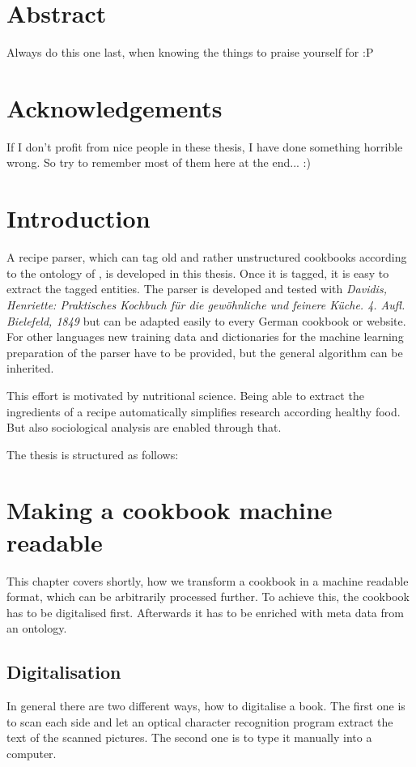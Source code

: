 \documentclass[12pt, twoside]{report}
\begin{document}
\chapter*{Abstract}
Always do this one last, when knowing the things to praise  yourself for :P

\chapter*{Acknowledgements}
If I don't profit from nice people in these thesis, I have done something horrible wrong. So try to remember most of them here at the end... :)

\tableofcontents

\listoffigures
\begingroup
	\let\clearpage\relax
	\listoftables
\endgroup

\clearpage
{}  
\chapter{Introduction}
A recipe parser, which can tag old and rather unstructured cookbooks according to the ontology of \parencite{schemaOrg}, is developed in this thesis. Once it is tagged, it is easy to extract the tagged entities. The parser is developed and tested with \textit{Davidis, Henriette: Praktisches Kochbuch für die gewöhnliche und feinere Küche. 4. Aufl. Bielefeld, 1849} but can be adapted easily to every German cookbook or website. For other languages new training data and dictionaries for the machine learning preparation of the parser have to be provided, but the general algorithm can be inherited.

This effort is motivated by nutritional science. Being able to extract the ingredients of a recipe automatically simplifies research according healthy food. But also sociological analysis are enabled through that.

The thesis is structured as follows:


\chapter{Making a cookbook machine readable}
This chapter covers shortly, how we transform a cookbook in a machine readable format, which can be arbitrarily processed further. To achieve this, the cookbook has to be digitalised first. Afterwards it has to be enriched with meta data from an ontology.

\section{Digitalisation}
In general there are two different ways, how to digitalise a book. The first one is to scan each side and let an optical character recognition program extract the text of the scanned pictures. The second one is to type it manually into a computer.
\end{document}
